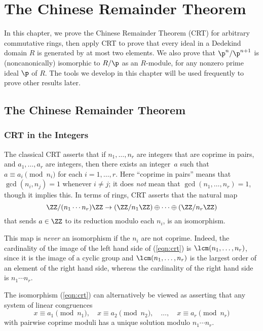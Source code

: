 
\chapter{The Chinese Remainder Theorem}\label{ch:crt}

In this chapter, we prove the Chinese Remainder Theorem (CRT) for
arbitrary commutative rings, then apply CRT to prove that every ideal
in a Dedekind domain $R$ is generated by at most two elements.  We
also prove that $\p^n/\p^{n+1}$ is (noncanonically) isomorphic to
$R/\p$ as an $R$-module, for any nonzero prime ideal $\p$ of $R$.  The
tools we develop in this chapter will be used frequently to prove
other results later.

\section{The Chinese Remainder Theorem}

\subsection{CRT in the Integers}
The classical CRT asserts that if $n_1, \dots, n_r$ are integers that are coprime
in pairs, and $a_1, \dots, a_r$ are integers, then there exists an
integer~$a$ such that $a \equiv a_i\pmod{n_i}$ for each $i=1, \dots,r$.
Here ``coprime in pairs'' means that $\gcd(n_i,n_j)=1$ whenever
$i\neq j$; it does {\em not} mean that $\gcd(n_1, \dots, n_r)=1$,
though it implies this.
In terms of rings, CRT asserts that the
natural map
\begin{equation}\label{eqn:crt}
\ZZ/(n_1\cdots n_r)\ZZ \to (\ZZ/n_1\ZZ)\oplus \cdots \oplus (\ZZ/n_r\ZZ)
\end{equation}
that sends $a \in \ZZ$ to its reduction modulo each $n_i$,
is an isomorphism.

This map is {\em never} an isomorphism if the $n_i$ are not coprime.
Indeed, the cardinality of the image of the left hand side of
(\ref{eqn:crt}) is $\lcm(n_1, \dots, n_r)$, since it is the image of a
cyclic group and $\lcm(n_1, \dots, n_r)$ is the largest order of an
element of the right hand side, whereas the cardinality of the right
hand side is $n_1\cdots n_r$.

The isomorphism (\ref{eqn:crt}) can alternatively be viewed as
asserting that any system of linear congruences
$$
x \equiv a_1 \pmod{n_1}, \quad
x \equiv a_2 \pmod{n_2}, \quad
\dots, \quad
x \equiv a_r \pmod{n_r}
$$
with pairwise coprime moduli has a unique solution modulo $n_1\cdots n_r$.

